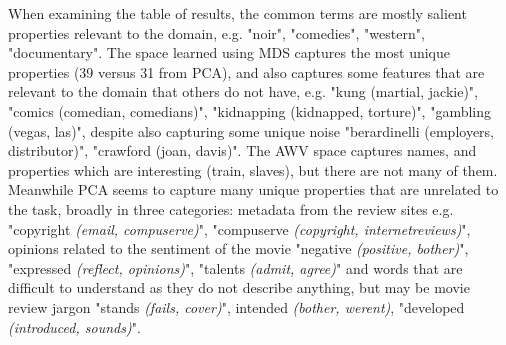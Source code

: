 When examining the table of results, the common terms are mostly salient properties relevant to the domain, e.g. "noir", "comedies", "western", "documentary". The space learned using MDS captures  the most unique  properties (39 versus 31 from PCA), and also captures some features that are relevant to the domain that others do not have, e.g. "kung (martial, jackie)", "comics (comedian, comedians)", "kidnapping (kidnapped, torture)", "gambling (vegas, las)", despite also capturing some unique noise "berardinelli (employers, distributor)", "crawford (joan, davis)". The AWV space captures names, and properties which are interesting (train, slaves), but there are not many of them. Meanwhile PCA seems to capture many unique  properties  that are unrelated to the task, broadly in three categories: metadata from the review sites e.g. "copyright \textit{(email, compuserve)}", "compuserve \textit{(copyright, internetreviews)}", opinions related  to the sentiment of the movie  "negative \textit{(positive, bother)}", "expressed \textit{(reflect, opinions)}", "talents \textit{(admit, agree)}" and words that are difficult to understand as they do not describe anything, but may be movie review jargon "stands \textit{(fails, cover)}", intended \textit{(bother, werent)}, "developed \textit{(introduced, sounds)}".
